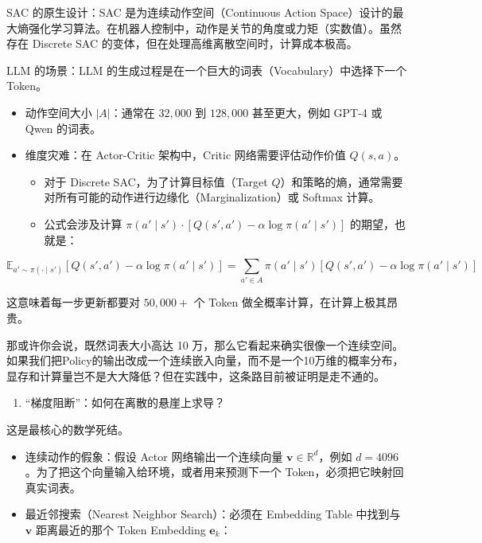 SAC 的原生设计：SAC 是为连续动作空间（Continuous Action Space）设计的最大熵强化学习算法。在机器人控制中，动作是关节的角度或力矩（实数值）。虽然存在 Discrete SAC 的变体，但在处理高维离散空间时，计算成本极高。

LLM 的场景：LLM 的生成过程是在一个巨大的词表（Vocabulary）中选择下一个 Token。

\begin{itemize}
\tightlist
\item
  动作空间大小 \(|A|\)：通常在 \(32,000\) 到 \(128,000\) 甚至更大，例如 GPT-4 或 Qwen 的词表。
\item
  维度灾难：在 Actor-Critic 架构中，Critic 网络需要评估动作价值 \(Q(s,a)\)。

  \begin{itemize}
  \tightlist
  \item
    对于 Discrete SAC，为了计算目标值（Target \(Q\)）和策略的熵，通常需要对所有可能的动作进行边缘化（Marginalization）或 Softmax 计算。
  \item
    公式会涉及计算 \(\pi(a' \mid s') \cdot [Q(s',a') - \alpha \log \pi(a' \mid s')]\) 的期望，也就是：
  \end{itemize}
\end{itemize}

\[
\mathbb{E}_{a'\sim \pi(\cdot \mid s')}
\left[
Q(s',a')-\alpha\log\pi(a'\mid s')
\right]
=
\sum_{a'\in A}\pi(a'\mid s')
\left[
Q(s',a')-\alpha\log\pi(a'\mid s')
\right]
\]

这意味着每一步更新都要对 \(50,000+\) 个 Token 做全概率计算，在计算上极其昂贵。

那或许你会说，既然词表大小高达 10 万，那么它看起来确实很像一个连续空间。如果我们把Policy的输出改成一个连续嵌入向量，而不是一个10万维的概率分布，显存和计算量岂不是大大降低？但在实践中，这条路目前被证明是走不通的。

\begin{enumerate}
\def\labelenumi{\arabic{enumi}.}
\tightlist
\item
  ``梯度阻断''：如何在离散的悬崖上求导？
\end{enumerate}

这是最核心的数学死结。

\begin{itemize}
\tightlist
\item
  连续动作的假象：假设 Actor 网络输出一个连续向量 \(\mathbf{v}\in\mathbb{R}^d\)，例如 \(d=4096\)。为了把这个向量输入给环境，或者用来预测下一个 Token，必须把它映射回真实词表。
\item
  最近邻搜索（Nearest Neighbor Search）：必须在 Embedding Table 中找到与 \(\mathbf{v}\) 距离最近的那个 Token Embedding \(\mathbf{e}_k\)：
\end{itemize}

